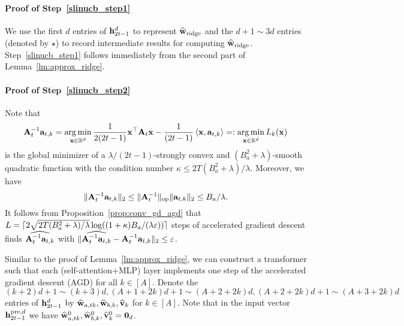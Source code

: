 \paragraph{Proof of Step~\ref{slinucb_step1}} We use the first $d$ entries of ${\mathbf h}_{2t-1}^{{d}}$ to represent $\widehat{{\mathbf w}}_{{\rm ridge}}$ and the $d+1\sim 3d$ entries (denoted by $\star$) to record intermediate results for computing $\widehat{{\mathbf w}}_{{\rm ridge}}$. Step~\ref{slinucb_step1} follows immediately from the second part of Lemma~\ref{lm:approx_ridge}.

\paragraph{Proof of Step~\ref{slinucb_step2}}
Note that $${\mathbf A}_{t}^{-1}{\mathbf a}_{t,k}=\operatorname*{arg\,min}_{{\mathbf x}\in\mathbb{R}^d}\frac{1}{2(2t-1)}{\mathbf x}^\top{\mathbf A}_t{\mathbf x}-\frac{1}{(2t-1)}\left\langle{\mathbf x},{\mathbf a}_{t,k}\right\rangle=:\operatorname*{arg\,min}_{{\mathbf x}\in\mathbb{R}^d}L_k({\mathbf x})$$ is the global minimizer of a $\lambda/(2t-1)$-strongly convex  and $(B_a^2+\lambda)$-smooth  quadratic function with the condition number $\kappa\leq 2T(B_a^2+\lambda)/\lambda$. Moreover, we have $$\|{\mathbf A}_{t}^{-1}{\mathbf a}_{t,k}\|_2\leq \|{{\mathbf A}_{t}^{-1}}\|_{\mathrm{op}}\|{\mathbf a}_{t,k}\|_2\leq B_a/\lambda.$$ It follows from  Proposition~\ref{prop:conv_gd_agd} that $L=\lceil2\sqrt{2 T(B_a^2+\lambda)/\lambda}\log((1+\kappa)B_a/(\lambda\varepsilon))\rceil$ steps of accelerated gradient descent finds $\widehat{{\mathbf A}_{t}^{-1}{\mathbf a}_{t,k}}$   with $\|\widehat{{\mathbf A}_{t}^{-1}{\mathbf a}_{t,k}}-{\mathbf A}_{t}^{-1}{\mathbf a}_{t,k}\|_2\leq\varepsilon$.

Similar to the proof of Lemma~\ref{lm:approx_ridge}, we can construct a transformer such that each (self-attention+MLP) layer implements one step of the accelerated gradient descent (AGD) for all $k\in[A]$. Denote the $(k+2)d+1\sim (k+3)d, (A+1+2k)d+1\sim (A+2+2k)d, (A+2+2k)d+1\sim (A+3+2k)d$ entries of  ${\mathbf h}_{2t-1}^{{d}}$ by $\widehat{{\mathbf w}}_{a,tk},\widehat{{\mathbf w}}_{b,k},\widehat{{\mathbf v}}_{k}$ for $k\in[A]$. Note that in the input vector ${\mathbf h}_{2t-1}^{{\mathrm{pre}},{d}}$ we have $\widehat{{\mathbf w}}^0_{a,tk},\widehat{{\mathbf w}}^0_{b,k},\widehat{{\mathbf v}}^0_{k}={\mathbf 0}_d$.

